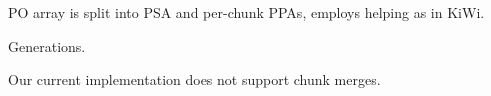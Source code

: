 PO array is split into PSA and per-chunk PPAs, employs 
helping as in KiWi. 

Generations.  

Our current implementation does not support chunk merges. 
